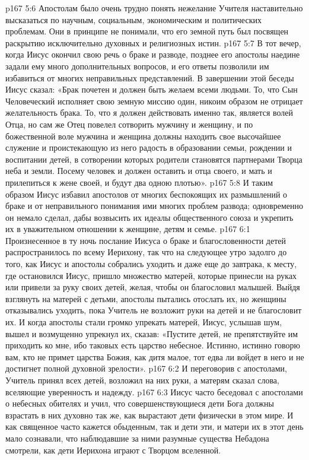 \vs p167 5:6 Апостолам было очень трудно понять нежелание Учителя наставительно высказаться по научным, социальным, экономическим и политических проблемам. Они в принципе не понимали, что его земной путь был посвящен раскрытию исключительно духовных и религиозных истин.
\vs p167 5:7 В тот вечер, когда Иисус окончил свою речь о браке и разводе, позднее его апостолы наедине задали ему много дополнительных вопросов, и его ответы позволили им избавиться от многих неправильных представлений. В завершении этой беседы Иисус сказал: «Брак почетен и должен быть желаем всеми людьми. То, что Сын Человеческий исполняет свою земную миссию один, никоим образом не отрицает желательность брака. То, что я должен действовать именно так, является волей Отца, но сам же Отец повелел сотворить мужчину и женщину, и по божественной воле мужчина и женщина должны находить свое высочайшее служение и проистекающую из него радость в образовании семьи, рождении и воспитании детей, в сотворении которых родители становятся партнерами Творца неба и земли. Посему человек и должен оставить и отца своего, и мать и прилепиться к жене своей, и будут два одною плотью».
\vs p167 5:8 И таким образом Иисус избавил апостолов от многих беспокоящих их размышлений о браке и от неправильного понимания ими многих проблем развода; одновременно он немало сделал, дабы возвысить их идеалы общественного союза и укрепить их в уважительном отношении к женщине, детям и семье.
\vs p167 6:1 Произнесенное в ту ночь послание Иисуса о браке и благословенности детей распространилось по всему Иерихону, так что на следующее утро задолго до того, как Иисус и апостолы собрались уходить и даже еще до завтрака, к месту, где остановился Иисус, пришло множество матерей, которые принесли на руках или привели за руку своих детей, желая, чтобы он благословил малышей. Выйдя взглянуть на матерей с детьми, апостолы пытались отослать их, но женщины отказывались уходить, пока Учитель не возложит руки на детей и не благословит их. И когда апостолы стали громко упрекать матерей, Иисус, услышав шум, вышел и возмущенно упрекнул их, сказав: «Пустите детей, не препятствуйте им приходить ко мне, ибо таковых есть царство небесное. Истинно, истинно говорю вам, кто не примет царства Божия, как дитя малое, тот едва ли войдет в него и не достигнет полной духовной зрелости».
\vs p167 6:2 И переговорив с апостолами, Учитель принял всех детей, возложил на них руки, а матерям сказал слова, вселяющие уверенность и надежду.
\vs p167 6:3 \pc Иисус часто беседовал с апостолами о небесных обителях и учил, что совершенствующиеся дети Бога должны взрастать в них духовно так же, как вырастают дети физически в этом мире. И как священное часто кажется обыденным, так и дети эти, и матери их в этот день мало сознавали, что наблюдавшие за ними разумные существа Небадона смотрели, как дети Иерихона играют с Творцом вселенной.
